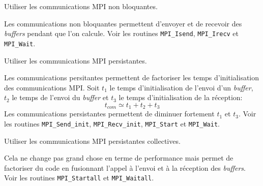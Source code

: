 \begin{questions}
	\question Utiliser les communications MPI non bloquantes.
	\begin{solution}
		Les communications non bloquantes permettent d'envoyer et de recevoir des \textit{buffers} pendant que l'on calcule.
		Voir les routines \texttt{MPI\_Isend}, \texttt{MPI\_Irecv} et \texttt{MPI\_Wait}.
	\end{solution}

	\question Utiliser les communications MPI persistantes.
	\begin{solution}
		Les communications persitantes permettent de factoriser les temps d'initialisation des communications MPI.
		Soit $t_1$ le temps d'initialisation de l'envoi d'un \textit{buffer}, $t_2$ le temps de l'envoi du \textit{buffer} et $t_3$ le temps d'initialisation de la réception:
		\begin{equation*}
			t_{com} \simeq t_1 + t_2 + t_3
		\end{equation*}
		Les communications persistantes permettent de diminuer fortement $t_1$ et $t_3$.
		Voir les routines \texttt{MPI\_Send\_init}, \texttt{MPI\_Recv\_init}, \texttt{MPI\_Start} et \texttt{MPI\_Wait}.
	\end{solution}

	\question Utiliser les communications MPI persistantes collectives.
	\begin{solution}
		Cela ne change pas grand chose en terme de performance mais permet de factoriser du code en fusionnant l'appel à l'envoi et à la réception des \textit{buffers}.
		Voir les routines \texttt{MPI\_Startall} et \texttt{MPI\_Waitall}.
	\end{solution}
\end{questions}
